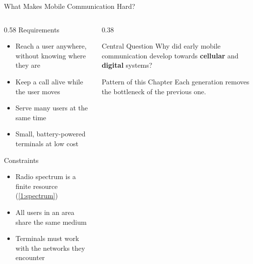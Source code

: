
\begin{frame}{What Makes Mobile Communication Hard?}
  \begin{columns}[T,onlytextwidth]
    \begin{column}{0.58\textwidth}
      Requirements
      \begin{itemize}
        \item Reach a user anywhere, without knowing where they are
        \item Keep a call alive while the user moves
        \item Serve many users at the same time
        \item Small, battery-powered terminals at low cost
      \end{itemize}
      \vspace{0.4em}
      Constraints
      \begin{itemize}
        \item Radio spectrum is a finite resource (\cref{1:spectrum})
        \item All users in an area share the same medium
        \item Terminals must work with the networks they encounter
      \end{itemize}
    \end{column}
    \begin{column}{0.38\textwidth}
      \begin{block}{Central Question}
        Why did early mobile communication develop towards \textbf{cellular} and \textbf{digital} systems?
      \end{block}
      \begin{alertblock}{Pattern of this Chapter}
        Each generation removes the bottleneck of the previous one.
      \end{alertblock}
    \end{column}
  \end{columns}
\end{frame}

